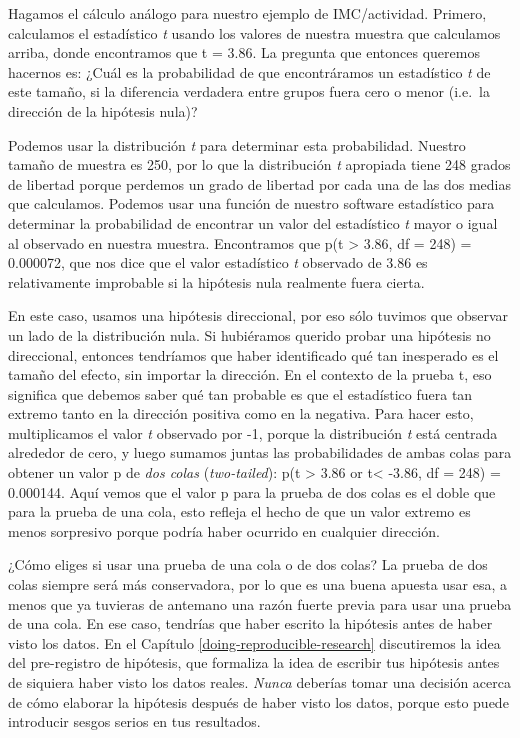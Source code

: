 \documentclass[
  12pt,
]{book}
\theoremstyle{definition}
\theoremstyle{definition}
\theoremstyle{definition}
\theoremstyle{remark}
\begin{document}
Hagamos el cálculo análogo para nuestro ejemplo de IMC/actividad. Primero, calculamos el estadístico \emph{t} usando los valores de nuestra muestra que calculamos arriba, donde encontramos que t = 3.86. La pregunta que entonces queremos hacernos es: ¿Cuál es la probabilidad de que encontráramos un estadístico \emph{t} de este tamaño, si la diferencia verdadera entre grupos fuera cero o menor (i.e.~la dirección de la hipótesis nula)?

Podemos usar la distribución \emph{t} para determinar esta probabilidad. Nuestro tamaño de muestra es 250, por lo que la distribución \emph{t} apropiada tiene 248 grados de libertad porque perdemos un grado de libertad por cada una de las dos medias que calculamos. Podemos usar una función de nuestro software estadístico para determinar la probabilidad de encontrar un valor del estadístico \emph{t} mayor o igual al observado en nuestra muestra. Encontramos que p(t \textgreater{} 3.86, df = 248) = 0.000072, que nos dice que el valor estadístico \emph{t} observado de 3.86 es relativamente improbable si la hipótesis nula realmente fuera cierta.

En este caso, usamos una hipótesis direccional, por eso sólo tuvimos que observar un lado de la distribución nula. Si hubiéramos querido probar una hipótesis no direccional, entonces tendríamos que haber identificado qué tan inesperado es el tamaño del efecto, sin importar la dirección. En el contexto de la prueba t, eso significa que debemos saber qué tan probable es que el estadístico fuera tan extremo tanto en la dirección positiva como en la negativa. Para hacer esto, multiplicamos el valor \emph{t} observado por -1, porque la distribución \emph{t} está centrada alrededor de cero, y luego sumamos juntas las probabilidades de ambas colas para obtener un valor p de \emph{dos colas} (\emph{two-tailed}): p(t \textgreater{} 3.86 or t\textless{} -3.86, df = 248) = 0.000144. Aquí vemos que el valor p para la prueba de dos colas es el doble que para la prueba de una cola, esto refleja el hecho de que un valor extremo es menos sorpresivo porque podría haber ocurrido en cualquier dirección.

¿Cómo eliges si usar una prueba de una cola o de dos colas? La prueba de dos colas siempre será más conservadora, por lo que es una buena apuesta usar esa, a menos que ya tuvieras de antemano una razón fuerte previa para usar una prueba de una cola. En ese caso, tendrías que haber escrito la hipótesis antes de haber visto los datos. En el Capítulo \ref{doing-reproducible-research} discutiremos la idea del pre-registro de hipótesis, que formaliza la idea de escribir tus hipótesis antes de siquiera haber visto los datos reales. \emph{Nunca} deberías tomar una decisión acerca de cómo elaborar la hipótesis después de haber visto los datos, porque esto puede introducir sesgos serios en tus resultados.
\end{document}
